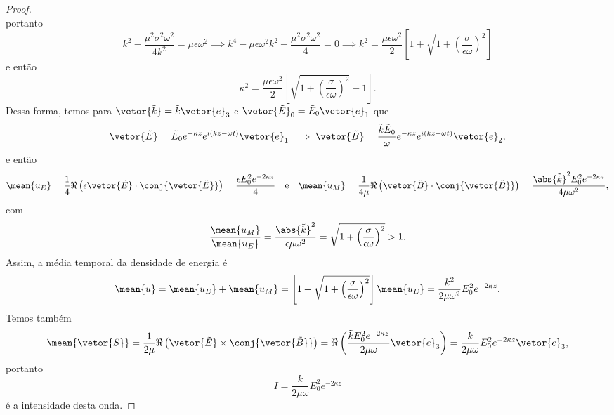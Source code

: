 \begin{proof}
\begin{equation*}
    \end{equation*}
    portanto
    \begin{equation*}
        k^2 - \frac{\mu^2 \sigma^2 \omega^2}{4k^2} = \mu \epsilon \omega^2 \implies k^4 - \mu \epsilon \omega^2 k^2 - \frac{\mu^2 \sigma^2 \omega^2}{4} = 0 \implies k^2 = \frac{\mu \epsilon \omega^2}{2}\left[1 + \sqrt{1 + \left(\frac{\sigma}{\epsilon \omega}\right)^2}\right]
    \end{equation*}
    e então
    \begin{equation*}
        \kappa^2 = \frac{\mu \epsilon \omega^2}{2}\left[\sqrt{1 + \left(\frac{\sigma}{\epsilon \omega}\right)^2}- 1\right].
    \end{equation*}
    Dessa forma, temos para \(\vetor{\tilde{k}} = \tilde{k} \vetor{e}_3\) e \(\vetor{\tilde{E}}_0 = \tilde{E}_0 \vetor{e}_1\) que
    \begin{equation*}
        \vetor{\tilde{E}} = \tilde{E}_0 e^{- \kappa z} e^{i(k z - \omega t)} \vetor{e}_1 \implies \vetor{\tilde{B}} = \frac{\tilde{k}\tilde{E}_0}{\omega}e^{- \kappa z} e^{i(k z - \omega t)} \vetor{e}_2,
    \end{equation*}
    e então
    \begin{equation*}
        \mean{u_E} = \frac14 \Re\left(\epsilon \vetor{\tilde{E}}\cdot \conj{\vetor{\tilde{E}}}\right) = \frac{\epsilon E_0^2 e^{-2 \kappa z}}{4}\quad\text{e}\quad
        \mean{u_M} = \frac{1}{4\mu} \Re\left(\vetor{\tilde{B}}\cdot\conj{\vetor{\tilde{B}}}\right) = \frac{\abs{\tilde{k}}^2 E_0^2 e^{-2 \kappa z}}{4\mu\omega^2},
    \end{equation*}
    com
    \begin{equation*}
        \frac{\mean{u_M}}{\mean{u_E}} = \frac{\abs{\tilde{k}}^2}{\epsilon \mu \omega^2} = \sqrt{1 + \left(\frac{\sigma}{\epsilon \omega}\right)^2} > 1.
    \end{equation*}
    Assim, a média temporal da densidade de energia é
    \begin{equation*}
        \mean{u} = \mean{u_E} + \mean{u_M} = \left[1 + \sqrt{1 + \left(\frac{\sigma}{\epsilon \omega}\right)^2}\right] \mean{u_E} = \frac{k^2}{2 \mu \omega^2}E_0^2 e^{-2 \kappa z}.
    \end{equation*}
    Temos também
    \begin{equation*}
        \mean{\vetor{S}} = \frac{1}{2\mu} \Re\left(\vetor{\tilde{E}}\times \conj{\vetor{\tilde{B}}}\right) = \Re\left(\frac{\tilde{k} E_0^2e^{-2 \kappa z}}{2\mu \omega} \vetor{e}_3\right) = \frac{k}{2 \mu \omega}E_0^2 e^{-2 \kappa z}\vetor{e}_3,
    \end{equation*}
    portanto
    \begin{equation*}
        I = \frac{k}{2\mu \omega} E_0^2 e^{-2 \kappa z}
    \end{equation*}
    é a intensidade desta onda.
\end{proof}
